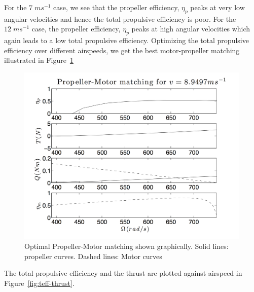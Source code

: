 \documentclass[11pt]{article}
\begin{document}
    For the $7 \; ms^{-1}$ case, we see that the propeller efficiency, $\eta_p$ peaks at very low angular velocities and hence the total propulsive efficiency is poor. For the $12 \; ms^{-1}$ case, the propeller efficiency, $\eta_p$ peaks at high angular velocities which again leads to a low total propulsive efficiency. Optimizing the total propulsive efficiency over different airspeeds, we get the best motor-propeller matching illustrated in Figure~\ref{fig:prop-motor2}

    \begin{figure}[h!]
    	\centering
    	\includegraphics[width=\textwidth]{Figures/PS3/propmotor_opt.png}
    	\caption{Optimal Propeller-Motor matching shown graphically. Solid lines: propeller curves. Dashed lines: Motor curves}\label{fig:prop-motor2}
    \end{figure}

    The total propulsive efficiency and the thrust are plotted against airspeed in Figure~\ref{fig:teff-thrust}.
\end{document}
